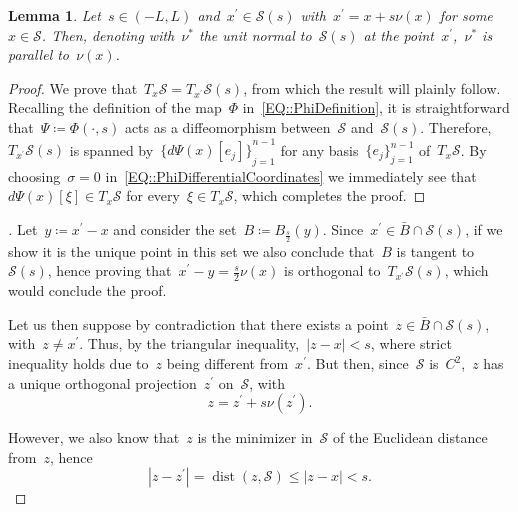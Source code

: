 \documentclass[12pt,a4paper]{amsart}
\numberwithin{equation}{section}
\newtheorem{lemma}[theorem]{Lemma}
\theoremstyle{definition}
\theoremstyle{remark}
\newcommand{\dist}{\operatorname{dist}}
\newcommand{\abs}[1]{\left\lvert#1\right\rvert}
\renewcommand{\leq}{\leqslant}
\begin{document}
\begin{appendix}
\begin{lemma}\label{LEM::GaussLemma}
    Let~$s \in (-L, L)$ and~$x^\prime \in \mathcal{S}(s)$ with~$x^\prime = x + s \nu(x)$ for some~$x \in \mathcal{S}$. Then, denoting with~$\nu^\ast$ the unit normal to~$\mathcal{S}(s)$ at the point~$x^\prime$,~$\nu^\ast$ is parallel to~$\nu(x)$.
\end{lemma}

\begin{proof}
    We prove that~$T_x\mathcal{S} = T_{x^\prime}\mathcal{S}(s)$, from which the result will plainly follow. Recalling the definition of the map~$\Phi$ in~\eqref{EQ::PhiDefinition}, it is straightforward that~$\Psi \coloneq \Phi(\cdot, s)$ acts as a diffeomorphism between~$\mathcal{S}$ and~$\mathcal{S}(s)$. Therefore,~$T_{x^\prime}\mathcal{S}(s)$ is spanned by~${\{d\Psi(x)[e_j]\}}_{j=1}^{n-1}$ for any basis~${\{e_j\}}_{j=1}^{n-1}$ of~$T_x\mathcal{S}$. By choosing~$\sigma = 0$ in~\eqref{EQ::PhiDifferentialCoordinates} we immediately see that~$d\Psi(x)[\xi] \in T_x\mathcal{S}$ for every~$\xi \in T_x\mathcal{S}$, which completes the proof.
\end{proof}

\begin{proof}[]
    Let~$y \coloneq x^\prime-x$ and consider the set~$B \coloneq B_{\frac{s}{2}}(y)$. Since~$x^\prime \in \bar{B} \cap \mathcal{S}(s)$, if we show it is the unique point in this set we also conclude that~$B$ is tangent to~$\mathcal{S}(s)$, hence proving that~$x^\prime-y = \frac{s}{2} \nu(x)$ is orthogonal to~$T_{x^\prime}\mathcal{S}(s)$, which would conclude the proof.

    Let us then suppose by contradiction that there exists a point~$z \in \bar{B} \cap \mathcal{S}(s)$, with~$z \neq x^\prime$. Thus, by the triangular inequality,~$\abs{z-x} < s$, where strict inequality holds due to~$z$ being different from~$x^\prime$. But then, since~$\mathcal{S}$ is~$C^2$,~$z$ has a unique orthogonal projection~$z^\prime$ on~$\mathcal{S}$, with
    \begin{equation}\label{EQ::zzPrime}
        z = z^\prime + s \nu(z^\prime).
    \end{equation}

    However, we also know that~$z$ is the minimizer in~$\mathcal{S}$ of the Euclidean distance from~$z$, hence
    \begin{equation}\label{EQ::zDistanceBound}
        \abs{z - z^\prime} = \dist(z, \mathcal{S}) \leq \abs{z-x} < s\text{.}
    \end{equation}


\end{proof}
\end{appendix}
\end{document}
